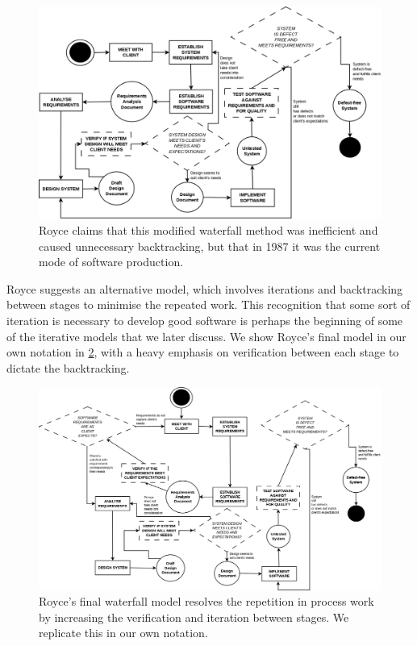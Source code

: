 \begin{figure}[ht!]
	\includegraphics[scale=0.3]{media/WaterfallRoyceTwo}
	\caption{Royce claims that this modified waterfall method was inefficient and caused unnecessary
		backtracking, but that in 1987 it was the current mode of software production.}
	\label{waterfallRoyceTwo}
\end{figure}

Royce suggests an alternative model, which involves iterations and backtracking between stages to
minimise the repeated work.
This recognition that some sort of iteration is necessary to develop good software is perhaps the
beginning of some of the iterative models that we later discuss.
We show Royce's final model in our own notation in \ref{waterfallRoyceThree}, with a heavy emphasis
on verification between each stage to dictate the backtracking.

\pagebreak

\begin{figure}[ht!]
	\includegraphics[angle=90,scale=0.3]{media/WaterfallRoyceThree}
	\caption{Royce's final waterfall model resolves the repetition in process work by increasing the
		verification and iteration between stages. We replicate this in our own notation.}
	\label{waterfallRoyceThree}
\end{figure}

